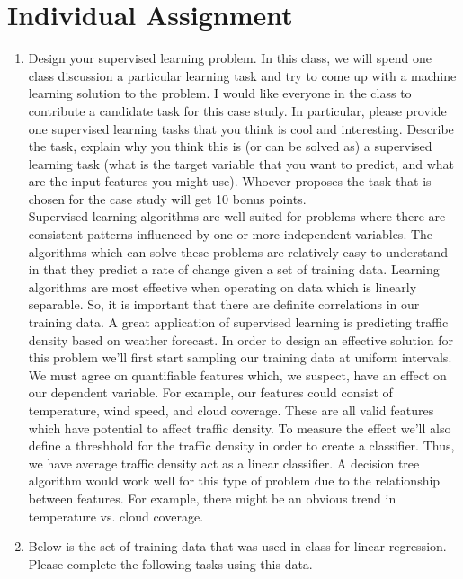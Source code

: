 \documentclass[letterpaper,10pt,titlepage]{article}
\begin{document}
\section[2]{Individual Assignment} 
\begin{enumerate} 
	\item Design your supervised learning problem. In this class, we will spend one class discussion a particular learning task and try to come up with a machine learning solution to the problem. I would like everyone in the class to contribute a candidate task for this case study. In particular, please provide one supervised learning tasks that you think is cool and interesting. Describe the task, explain why you think this is (or can be solved as) a supervised learning task (what is the target variable that you want to predict, and what are the input features you might use). Whoever proposes the task that is chosen for the case study will get 10 bonus points. \\

 Supervised learning algorithms are well suited for problems where there are consistent patterns influenced by one or more independent variables. The algorithms which can solve these problems are relatively easy to understand in that they predict a rate of change given a set of training data. Learning algorithms are most effective when operating on data which is linearly separable. So, it is important that there are definite correlations in our training data. A great application of supervised learning is predicting traffic density based on weather forecast. In order to design an effective solution for this problem we'll first start sampling our training data at uniform intervals. We must agree on quantifiable features which, we suspect, have an effect on our dependent variable. For example, our features could consist of temperature, wind speed, and cloud coverage. These are all valid features which have potential to affect traffic density. To measure the effect we'll also define a threshhold for the traffic density in order to create a classifier. Thus, we have average traffic density act as a linear classifier. A decision tree algorithm would work well for this type of problem due to the relationship between features. For example, there might be an obvious trend in temperature vs. cloud coverage. \\[15mm]

	\item Below is the set of training data that was used in class for linear regression. Please complete the following tasks using this data.


\end{enumerate}
\end{document}
